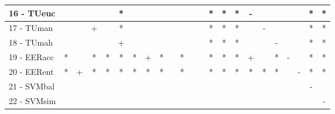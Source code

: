 \begin{table}[h]
\begin{center}
\begin{tabular}{lcc|cc|cc|cc|cc|cc|cc|cc|cc|cc|cc}
16 - TUeuc	&   &   &   &   & * &   &   &   &   &   &   &   & * & * & * & - &   &   &   &   & * & * \\ \hline
17 - TUman	&   &   & + &   & * &   &   &   &   &   &   &   & * & * & * &   & - &   &   &   & * & * \\
18 - TUmah	&   &   &   &   & + &   &   &   &   &   &   &   & * & * & * &   &   & - &   &   & * & * \\ \hline
19 - EERacc	& * &   & * & * & * & * & + & * &   & * &   &   & * & * & * & + &   & * & - &   & * & * \\
20 - EERent	& * & + & * & * & * & * & * & * &   & * &   &   & * & * & * & * & * & * &   & - & * & * \\ \hline
21 - SVMbal	&   &   &   &   &   &   &   &   &   &   &   &   &   &   &   &   &   &   &   &   & - &   \\
22 - SVMsim	&   &   &   &   &   &   &   &   &   &   &   &   &   &   &   &   &   &   &   &   &   & - \\ \hline\end{tabular}

\label{stratsfriedRFw}
\end{center}
\end{table}
